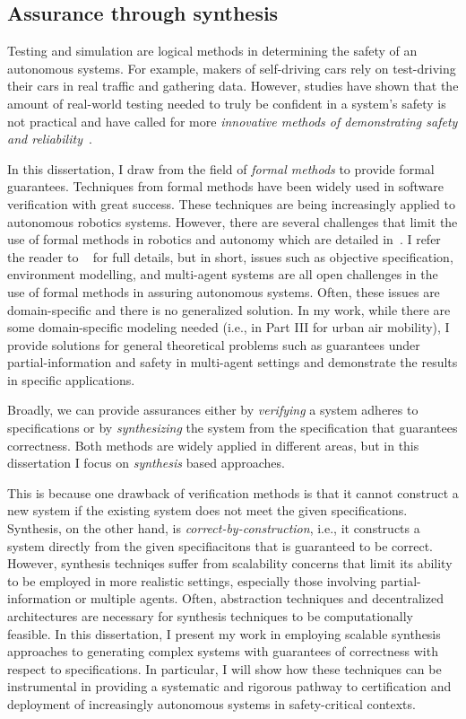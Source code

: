 \subsection{Assurance through synthesis}

Testing and simulation are logical methods in determining the safety of an autonomous systems. For example, makers of self-driving cars rely on test-driving their cars in real traffic and gathering data. However, studies have shown that the amount of real-world testing needed to truly be confident in a system's safety is not practical and have called for more \emph{innovative methods of demonstrating safety and reliability}~\cite{KALRA2016182}. 

In this dissertation, I draw from the field of \emph{formal methods} to provide formal guarantees. Techniques from formal methods have been widely used in software verification with great success. These techniques are being increasingly applied to autonomous robotics systems. However, there are several challenges that limit the use of formal methods in robotics and autonomy which are detailed in~\cite{10.1145/3342355}. I refer the reader to ~\cite{10.1145/3342355} for full details, but in short, issues such as objective specification, environment modelling, and multi-agent systems are all open challenges in the use of formal methods in assuring autonomous systems. Often, these issues are domain-specific and there is no generalized solution. In my work, while there are some domain-specific modeling needed (i.e., in Part III for urban air mobility), I provide solutions for general theoretical problems such as guarantees under partial-information and safety in multi-agent settings and demonstrate the results in specific applications. 

Broadly, we can provide assurances either by \emph{verifying} a system adheres to specifications or by \emph{synthesizing} the system from the specification that guarantees correctness. Both methods are widely applied in different areas, but in this dissertation I focus on \emph{synthesis} based approaches.

This is because one drawback of verification methods is that it cannot construct a new system if the existing system does not meet the given specifications. Synthesis, on the other hand, is \emph{correct-by-construction}, i.e., it constructs a system directly from the given specifiacitons that is guaranteed to be correct. However, synthesis techniqes suffer from scalability concerns that limit its ability to be employed in more realistic settings, especially those involving partial-information or multiple agents. Often, abstraction techniques and decentralized architectures are necessary for synthesis techniques to be computationally feasible. In this dissertation, I present my work in employing scalable synthesis approaches to generating complex systems with guarantees of correctness with respect to specifications. In particular, I will show how these techniques can be instrumental in providing a systematic and rigorous pathway to certification and deployment of increasingly autonomous systems in safety-critical contexts.  


